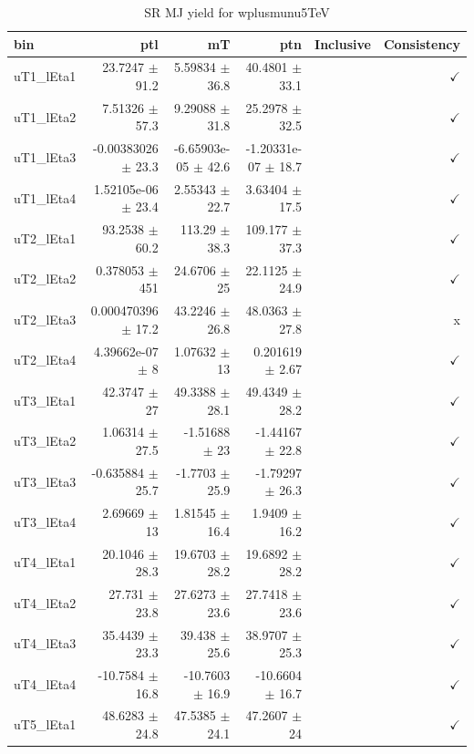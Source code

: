 \begin{table}[htbp]
\centering
\scriptsize
\caption{SR MJ yield for wplusmunu5TeV}
\label{tab:wplusmunu5TeV}
\setlength{\tabcolsep}{6pt}
\begin{tabular}{lrrrrr}
\hline
bin & ptl & mT & ptn & Inclusive & Consistency \\
\hline
uT1\_lEta1 & 23.7247 $\pm$ 91.2 & 5.59834 $\pm$ 36.8 & 40.4801 $\pm$ 33.1 &  & $\checkmark$ \\
uT1\_lEta2 & 7.51326 $\pm$ 57.3 & 9.29088 $\pm$ 31.8 & 25.2978 $\pm$ 32.5 &  & $\checkmark$ \\
uT1\_lEta3 & -0.00383026 $\pm$ 23.3 & -6.65903e-05 $\pm$ 42.6 & -1.20331e-07 $\pm$ 18.7 &  & $\checkmark$ \\
uT1\_lEta4 & 1.52105e-06 $\pm$ 23.4 & 2.55343 $\pm$ 22.7 & 3.63404 $\pm$ 17.5 &  & $\checkmark$ \\
uT2\_lEta1 & 93.2538 $\pm$ 60.2 & 113.29 $\pm$ 38.3 & 109.177 $\pm$ 37.3 &  & $\checkmark$ \\
uT2\_lEta2 & 0.378053 $\pm$ 451 & 24.6706 $\pm$ 25 & 22.1125 $\pm$ 24.9 &  & $\checkmark$ \\
uT2\_lEta3 & 0.000470396 $\pm$ 17.2 & 43.2246 $\pm$ 26.8 & 48.0363 $\pm$ 27.8 &  & x \\
uT2\_lEta4 & 4.39662e-07 $\pm$ 8 & 1.07632 $\pm$ 13 & 0.201619 $\pm$ 2.67 &  & $\checkmark$ \\
uT3\_lEta1 & 42.3747 $\pm$ 27 & 49.3388 $\pm$ 28.1 & 49.4349 $\pm$ 28.2 &  & $\checkmark$ \\
uT3\_lEta2 & 1.06314 $\pm$ 27.5 & -1.51688 $\pm$ 23 & -1.44167 $\pm$ 22.8 &  & $\checkmark$ \\
uT3\_lEta3 & -0.635884 $\pm$ 25.7 & -1.7703 $\pm$ 25.9 & -1.79297 $\pm$ 26.3 &  & $\checkmark$ \\
uT3\_lEta4 & 2.69669 $\pm$ 13 & 1.81545 $\pm$ 16.4 & 1.9409 $\pm$ 16.2 &  & $\checkmark$ \\
uT4\_lEta1 & 20.1046 $\pm$ 28.3 & 19.6703 $\pm$ 28.2 & 19.6892 $\pm$ 28.2 &  & $\checkmark$ \\
uT4\_lEta2 & 27.731 $\pm$ 23.8 & 27.6273 $\pm$ 23.6 & 27.7418 $\pm$ 23.6 &  & $\checkmark$ \\
uT4\_lEta3 & 35.4439 $\pm$ 23.3 & 39.438 $\pm$ 25.6 & 38.9707 $\pm$ 25.3 &  & $\checkmark$ \\
uT4\_lEta4 & -10.7584 $\pm$ 16.8 & -10.7603 $\pm$ 16.9 & -10.6604 $\pm$ 16.7 &  & $\checkmark$ \\
uT5\_lEta1 & 48.6283 $\pm$ 24.8 & 47.5385 $\pm$ 24.1 & 47.2607 $\pm$ 24 &  & $\checkmark$ \\

\end{tabular}
\end{table}
